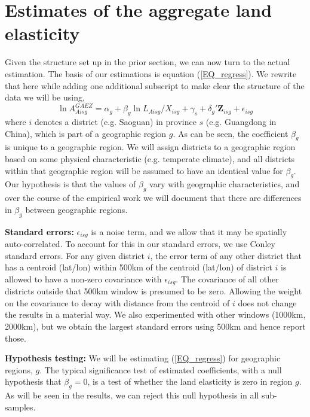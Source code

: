 \documentclass[11pt]{article}
\begin{document}
\section{Estimates of the aggregate land elasticity}
Given the structure set up in the prior section, we can now turn to the actual estimation. The basis of our estimations is equation (\ref{EQ_regress}). We rewrite that here while adding one additional subscript to make clear the structure of the data we will be using,
\begin{equation}
\ln A^{GAEZ}_{Aisg} = \alpha_g + \beta_g \ln L_{Aisg}/X_{isg} + \gamma_{s} + \delta_g' \mathbf{Z}_{isg} + \epsilon_{isg} \label{EQ_model}
\end{equation}
where $i$ denotes a district (e.g. Saoguan) in province $s$ (e.g. Guangdong in China), which is part of a geographic region $g$. As can be seen, the coefficient $\beta_g$ is unique to a geographic region. We will assign districts to a geographic region based on some physical characteristic (e.g. temperate climate), and all districts within that geographic region will be assumed to have an identical value for $\beta_g$. Our hypothesis is that the values of $\beta_g$ vary with geographic characteristics, and over the course of the empirical work we will document that there are differences in $\beta_g$ between geographic regions.

\vspace{.5cm}\noindent\textbf{Standard errors:} $\epsilon_{isg}$ is a noise term, and we allow that it may be spatially auto-correlated. To account for this in our standard errors, we use Conley standard errors. For any given district $i$, the error term of any other district that has a centroid (lat/lon) within 500km of the centroid (lat/lon) of district $i$ is allowed to have a non-zero covariance with $\epsilon_{isg}$. The covariance of all other districts outside that 500km window is presumed to be zero. Allowing the weight on the covariance to decay with distance from the centroid of $i$ does not change the results in a material way. We also experimented with other windows (1000km, 2000km), but we obtain the largest standard errors using 500km and hence report those.

\vspace{.5cm}\noindent\textbf{Hypothesis testing:} We will be estimating (\ref{EQ_regress}) for geographic regions, $g$. The typical significance test of estimated coefficients, with a null hypothesis that $\beta_g=0$, is a test of whether the land elasticity is zero in region $g$. As will be seen in the results, we can reject this null hypothesis in all sub-samples.
\end{document}
